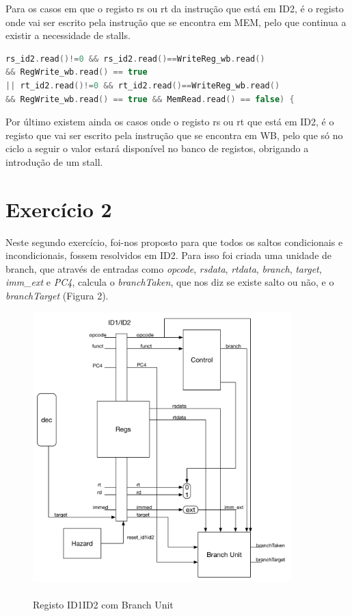 \documentclass[pdftex,12pt,a4paper]{report}
\begin{document}
Para os casos em que o registo rs ou rt da instrução que está em ID2, é o registo onde vai ser escrito pela instrução que se encontra em MEM, pelo que continua a existir a necessidade de stalls.

\begin{lstlisting}[language=c]
rs_id2.read()!=0 && rs_id2.read()==WriteReg_wb.read() 
&& RegWrite_wb.read() == true
|| rt_id2.read()!=0 && rt_id2.read()==WriteReg_wb.read() 
&& RegWrite_wb.read() == true && MemRead.read() == false) {
\end{lstlisting} 

Por último existem ainda os casos onde o registo rs ou rt que está em ID2, é o registo que vai ser escrito pela instrução que se encontra em WB, pelo que só no ciclo a seguir o valor estará disponível no banco de registos, obrigando a introdução de um stall.
\newpage
\section{Exercício 2}

Neste segundo exercício, foi-nos proposto para que todos os saltos condicionais e incondicionais, fossem resolvidos em ID2. Para isso foi criada uma unidade de branch, que através de entradas como \textit{opcode}, \textit{rsdata}, \textit{rtdata}, \textit{branch}, \textit{target}, \textit{imm\_ext} e \textit{PC4}, calcula o \textit{branchTaken}, que nos diz se existe salto ou não, e o \textit{branchTarget} (Figura 2).

\begin{figure}[!htb]
\center
 \includegraphics[width=100mm,scale=1]{ID1ID2ex2.pdf}
 \caption{\\Registo ID1ID2 com Branch Unit}\label{fig:ex2RegID1ID2}
\end{figure}
\end{document}
